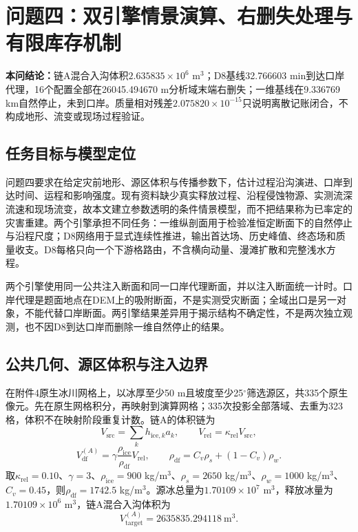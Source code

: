 \section{问题四：双引擎情景演算、右删失处理与有限库存机制}
\noindent\textbf{本问结论：}链A混合入沟体积$2.635835\times10^6$ m$^3$；D8基线32.766603 min到达口岸代理，16个配置全部在26045.494670 m分析域末端右删失；一维基线在9.336769 km自然停止，未到口岸。质量相对残差$2.075820\times10^{-15}$只说明离散记账闭合，不构成地形、流变或现场过程验证。

\subsection{任务目标与模型定位}
问题四要求在给定灾前地形、源区体积与传播参数下，估计过程沿沟演进、口岸到达时间、运程和影响强度。现有资料缺少真实释放过程、沿程侵蚀物源、实测流深流速和现场流变，故本文建立参数透明的条件情景模型，而不把结果称为已率定的灾害重建。两个引擎承担不同任务：一维纵剖面用于检验准恒定断面下的自然停止与沿程尺度；D8网络用于显式连续性推进，输出首达场、历史峰值、终态场和质量收支。D8每格只向一个下游格路由，不含横向动量、漫滩扩散和完整浅水方程\cite{obrien1993}。

两个引擎使用同一公共注入断面和同一口岸代理断面，并以注入断面统一计时。口岸代理是题面地点在DEM上的吸附断面，不是实测受灾断面；全域出口是另一对象，不能代替口岸断面。两引擎结果差异用于揭示结构不确定性，不是两次独立观测，也不因D8到达口岸而删除一维自然停止的结果。

\subsection{公共几何、源区体积与注入边界}
在附件4原生冰川网格上，以冰厚至少50 m且坡度至少25$^\circ$筛选源区，共335个原生像元。先在原生网格积分，再映射到演算网格；335次投影全部落域、去重为323格，体积不在映射阶段重复计数。链A的体积链为
\begin{equation}
V_{\mathrm{src}}=\sum_{k}h_{\mathrm{ice},k}a_k,\qquad
V_{\mathrm{rel}}=\kappa_{\mathrm{rel}}V_{\mathrm{src}},
\end{equation}
\begin{equation}
V_{\mathrm{df}}^{(A)}
=\gamma\frac{\rho_{\mathrm{ice}}}{\rho_{\mathrm{df}}}V_{\mathrm{rel}},
\qquad
\rho_{\mathrm{df}}
=C_v\rho_s+(1-C_v)\rho_w.
\end{equation}
取$\kappa_{\mathrm{rel}}=0.10$、$\gamma=3$、$\rho_{\mathrm{ice}}=900$ kg/m$^3$、$\rho_s=2650$ kg/m$^3$、$\rho_w=1000$ kg/m$^3$、$C_v=0.45$，则$\rho_{\mathrm{df}}=1742.5$ kg/m$^3$。源冰总量为$1.70109\times10^7$ m$^3$，释放冰量为$1.70109\times10^6$ m$^3$，链A混合入沟体积为
\begin{equation}
V_{\mathrm{target}}^{(A)}
=2635835.294118\ \mathrm{m^3}.
\end{equation}

